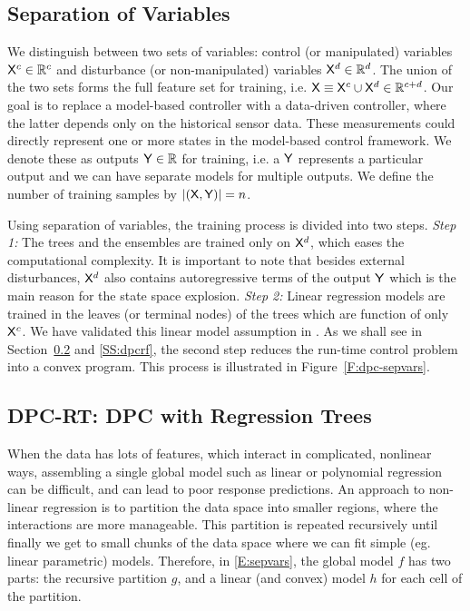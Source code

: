 \subsection{Separation of Variables}
\label{SS:sepvar}
We distinguish between two sets of variables: control (or manipulated) variables $\mathsf{X}^c \in \mathbb{R}^c$ and disturbance (or non-manipulated) variables $\mathsf{X}^d \in \mathbb{R}^d$. The union of the two sets forms the full feature set for training, i.e. $\mathsf{X} \equiv \mathsf{X}^c \cup \mathsf{X}^d \in \mathbb{R}^{c+d}$.
Our goal is to replace a model-based controller with a data-driven controller, where the latter depends only on the historical sensor data. 
These measurements could directly represent one or more states in the model-based control framework. We denote these as outputs $\mathsf{Y} \in \mathbb{R}$ for training, i.e. a $\mathsf{Y}$ represents a particular output and we can have separate models for multiple outputs. We define the number of training samples by $|(\mathsf{X},\mathsf{Y})| = n$.

Using separation of variables, the training process is divided into two steps. \textit{Step 1:} The trees and the ensembles are trained only on $\mathsf{X}^d$, which eases the computational complexity. It is important to note that besides external disturbances, $\mathsf{X}^d$ also contains autoregressive terms of the output $\mathsf{Y}$ which is the main reason for the state space explosion. \textit{Step 2:} Linear regression models are trained in the leaves (or terminal nodes) of the trees which are function of only $\mathsf{X}^c$. We have validated this linear model assumption in \cite{Jain2016}. As we shall see in Section~\ref{SS:dpcrt} and \ref{SS:dpcrf}, the second step reduces the run-time control problem into a convex program. This process is illustrated in Figure~\ref{F:dpc-sepvars}.

\subsection{DPC-RT: DPC with Regression Trees}
\label{SS:dpcrt}
When the data has lots of features, which interact in complicated, nonlinear ways, assembling a single global model such as linear or polynomial regression can be difficult, and can lead to poor response predictions.
An approach to non-linear regression is to partition the data space into smaller regions, where the interactions are more manageable. 
This partition is repeated recursively until finally we get to small chunks of the data space where we can fit simple (eg. linear parametric) models. 
Therefore, in \eqref{E:sepvars}, the global model $f$ has two parts: the recursive partition $g$, and a linear (and convex) model $h$ for each cell of the partition.

